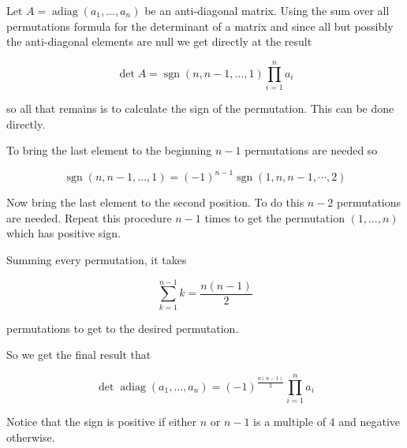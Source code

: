 \documentclass[12pt]{article}
\begin{document}
Let $A=\operatorname{adiag}(a_1, \ldots, a_n)$ be an anti-diagonal matrix. Using the sum over all permutations formula for the determinant of a matrix and since all but possibly the anti-diagonal elements are null we get directly at the result

$$\operatorname{det} A =\operatorname{sgn}(n,n-1,\ldots,1) \prod_{i=1}^n a_i $$

so all that remains is to calculate the sign of the permutation.
This can be done directly.

To bring the last element to the beginning $n-1$ permutations are needed so

$$\operatorname{sgn}(n,n-1,\ldots,1) = (-1)^{n-1} \operatorname{sgn}(1,n,n-1,\cdots,2)$$

Now bring the last element to the second position.
To do this $n-2$ permutations are needed.
Repeat this procedure $n-1$ times to get the permutation $(1,\ldots,n)$ which has positive sign.

Summing every permutation, it takes

$$\sum_{k=1}^{n-1} k = \frac{n(n-1)}{2}$$

permutations to get to the desired permutation.

So we get the final result that 

$$\operatorname{det} \operatorname{adiag}(a_1, \ldots, a_n) = (-1)^{\frac{n(n-1)}{2}}  \prod_{i=1}^n a_i $$

Notice that the sign is positive if either $n$ or $n-1$ is a multiple of $4$ and negative otherwise.
\end{document}
